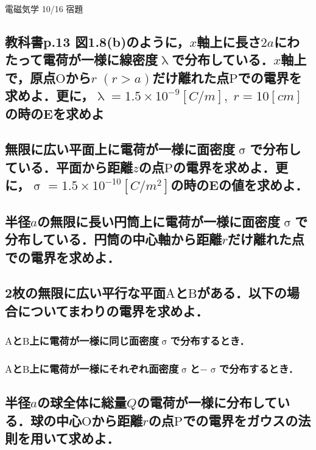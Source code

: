 \documentclass[a4j,12pt]{jsarticle}
\begin{document}
\begin{center}
    \begin{LARGE}
        {\huge 電磁気学 10/16 宿題} 
    \end{LARGE}
\end{center}

\subsection{教科書p.13 図1.8(b)のように，\(x\)軸上に長さ\(2a\)にわたって電荷が一様に線密度\(\uplambda\)で分布している．\(x\)軸上で，原点\(\mathrm{O}\)から\(r\;(r>a)\)だけ離れた点\(\mathrm{P}\)での電界を求めよ．更に，\(\uplambda=1.5\times10^{-9}\si{[C/m]},\;r=10\si{[cm]}\)の時の\(\bm{E}\)を求めよ}

\vspace{20em}

\subsection{無限に広い平面上に電荷が一様に面密度\(\upsigma\)で分布している．平面から距離\(z\)の点\(\mathrm{P}\)の電界を求めよ．更に，\(\upsigma=1.5\times10^{-10}\si{[C/m^2]}\)の時の\(\bm{E}\)の値を求めよ．}

\newpage

\subsection{半径\(a\)の無限に長い円筒上に電荷が一様に面密度\(\upsigma\)で分布している．円筒の中心軸から距離\(r\)だけ離れた点での電界を求めよ．}

\vspace{20em}

\subsection{2枚の無限に広い平行な平面\(\mathrm{A}\)と\(\mathrm{B}\)がある．以下の場合についてまわりの電界を求めよ．}
\subsubsection{\(\mathrm{A}\)と\(\mathrm{B}\)上に電荷が一様に同じ面密度\(\upsigma\)で分布するとき．}
\vspace{12em}

\subsubsection{\(\mathrm{A}\)と\(\mathrm{B}\)上に電荷が一様にそれぞれ面密度\(\upsigma\)と\(-\upsigma\)で分布するとき．}
\newpage

\subsection{半径\(a\)の球全体に総量\(Q\)の電荷が一様に分布している．球の中心\(\mathrm{O}\)から距離\(r\)の点\(\mathrm{P}\)での電界をガウスの法則を用いて求めよ．}
\end{document}
